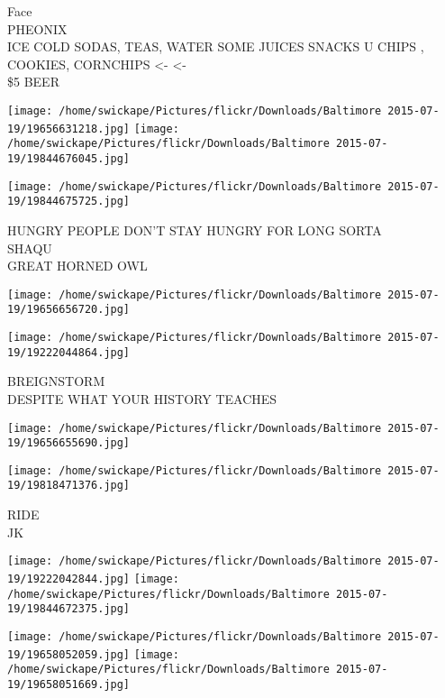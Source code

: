 \documentclass[10pt,letterpaper]{article}
\begin{document}
Face\\
PHEONIX\\
ICE COLD SODAS, TEAS, WATER SOME JUICES SNACKS U CHIPS , COOKIES, CORNCHIPS <{-} <{-}\\
\$5 BEER\\
\pagebreak

\texttt{[image: /home/swickape/Pictures/flickr/Downloads/Baltimore 2015-07-19/19656631218.jpg]}
\texttt{[image: /home/swickape/Pictures/flickr/Downloads/Baltimore 2015-07-19/19844676045.jpg]}

\vspace{0.25in}
\texttt{[image: /home/swickape/Pictures/flickr/Downloads/Baltimore 2015-07-19/19844675725.jpg]}

HUNGRY PEOPLE DON'T STAY HUNGRY FOR LONG SORTA\\
SHAQU\\
GREAT HORNED OWL\\
\pagebreak

\texttt{[image: /home/swickape/Pictures/flickr/Downloads/Baltimore 2015-07-19/19656656720.jpg]}

\vspace{0.25in}
\texttt{[image: /home/swickape/Pictures/flickr/Downloads/Baltimore 2015-07-19/19222044864.jpg]}

BREIGNSTORM\\
DESPITE WHAT YOUR HISTORY TEACHES\\
\pagebreak

\texttt{[image: /home/swickape/Pictures/flickr/Downloads/Baltimore 2015-07-19/19656655690.jpg]}

\vspace{0.25in}
\texttt{[image: /home/swickape/Pictures/flickr/Downloads/Baltimore 2015-07-19/19818471376.jpg]}

RIDE\\
JK\\
\pagebreak

\texttt{[image: /home/swickape/Pictures/flickr/Downloads/Baltimore 2015-07-19/19222042844.jpg]}
\texttt{[image: /home/swickape/Pictures/flickr/Downloads/Baltimore 2015-07-19/19844672375.jpg]}

\texttt{[image: /home/swickape/Pictures/flickr/Downloads/Baltimore 2015-07-19/19658052059.jpg]}
\texttt{[image: /home/swickape/Pictures/flickr/Downloads/Baltimore 2015-07-19/19658051669.jpg]}
\end{document}
